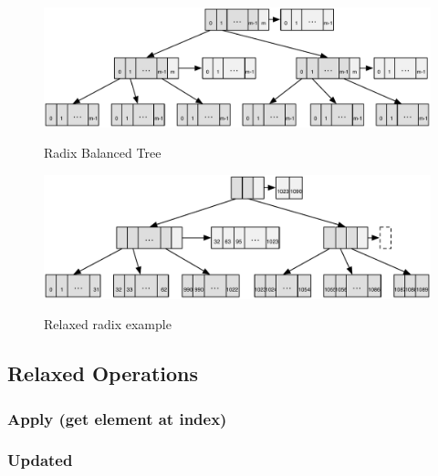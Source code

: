 \begin{figure}[h!]
  \centering
  \includegraphics[width=\textwidth]{Figures/Relaxed_Radix_balanced}
  \label{Relaxed_Radix_balanced}
  \caption{Radix Balanced Tree}
\end{figure}

\begin{figure}[h!]
  \centering
  \includegraphics[width=\textwidth]{Figures/Relaxed_radix_example}
  \label{Relaxed_radix_example}
  \caption{Relaxed radix example}
\end{figure}

\subsection{Relaxed Operations}


\subsubsection{Apply (get element at index)}



\subsubsection{Updated}

